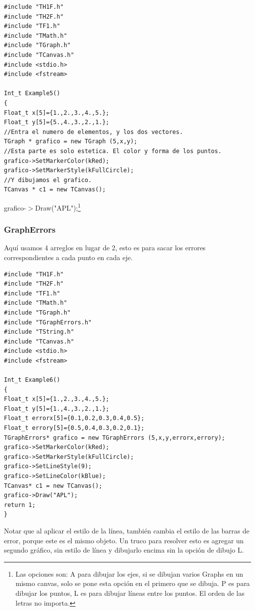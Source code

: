 \documentclass{article}
\begin{document}
\begin{tcolorbox} [breakable]
\begin{verbatim}
#include "TH1F.h"
#include "TH2F.h"
#include "TF1.h"
#include "TMath.h"
#include "TGraph.h"
#include "TCanvas.h"
#include <stdio.h>
#include <fstream>

Int_t Example5()
{
Float_t x[5]={1.,2.,3.,4.,5.};
Float_t y[5]={5.,4.,3.,2.,1.};
//Entra el numero de elementos, y los dos vectores.
TGraph * grafico = new TGraph (5,x,y);
//Esta parte es solo estetica. El color y forma de los puntos.
grafico->SetMarkerColor(kRed);
grafico->SetMarkerStyle(kFullCircle);
//Y dibujamos el grafico.
TCanvas * c1 = new TCanvas();
\end{verbatim}
grafico-$>$Draw("APL");\footnote{Las opciones son: A para dibujar los ejes, si se dibujan varios Graphs en un mismo canvas, solo se pone esta opci\'on en el primero que se dibuja. P es para dibujar los puntos, L es para dibujar l\'ineas entre los puntos. El orden de las letras no importa.}
\end{tcolorbox}

\subsubsection{GraphErrors}

Aqu\'i usamos 4 arreglos en lugar de 2, esto es para sacar los errores correspondientes a cada punto en cada eje.

\begin{tcolorbox} [breakable]
\begin{verbatim}
#include "TH1F.h"
#include "TH2F.h"
#include "TF1.h"
#include "TMath.h"
#include "TGraph.h"
#include "TGraphErrors.h"
#include "TString.h"
#include "TCanvas.h"
#include <stdio.h>
#include <fstream>

Int_t Example6()
{
Float_t x[5]={1.,2.,3.,4.,5.};
Float_t y[5]={1.,4.,3.,2.,1.};
Float_t errorx[5]={0.1,0.2,0.3,0.4,0.5};
Float_t errory[5]={0.5,0.4,0.3,0.2,0.1};
TGraphErrors* grafico = new TGraphErrors (5,x,y,errorx,errory);
grafico->SetMarkerColor(kRed);
grafico->SetMarkerStyle(kFullCircle);
grafico->SetLineStyle(9);
grafico->SetLineColor(kBlue);
TCanvas* c1 = new TCanvas();
grafico->Draw("APL");
return 1;
}
\end{verbatim}
\end{tcolorbox}
Notar que al aplicar el estilo de la l\'inea, tambi\'en cambia el estilo de las barras de error, porque este es el mismo objeto. Un truco para resolver esto es agregar un segundo gr\'afico, sin estilo de l\'inea y dibujarlo encima sin la opci\'on de dibujo L. \newline 
\end{document}

